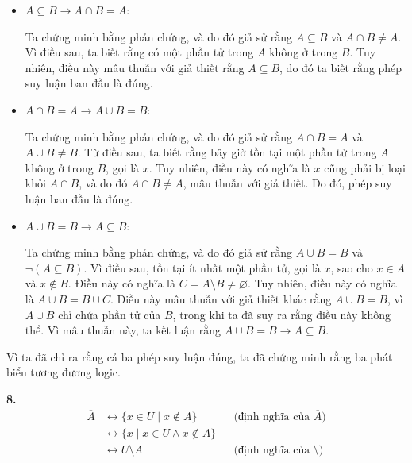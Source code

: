 \documentclass[12pt,a4paper]{article}
\theoremstyle{definition}
\begin{document}
\begin{itemize}
\item $A \subseteq B \to A \cap B = A$:

Ta chứng minh bằng phản chứng, và do đó giả sử rằng $A \subseteq B$ và $A \cap B \neq A$. Vì điều sau, ta biết rằng có một phần tử trong $A$ không ở trong $B$. Tuy nhiên, điều này mâu thuẫn với giả thiết rằng $A \subseteq B$, do đó ta biết rằng phép suy luận ban đầu là đúng.

\item $A \cap B = A \to A \cup B = B$:

Ta chứng minh bằng phản chứng, và do đó giả sử rằng $A \cap B = A$ và $A \cup B \neq B$. Từ điều sau, ta biết rằng bây giờ tồn tại một phần tử trong $A$ không ở trong $B$, gọi là $x$. Tuy nhiên, điều này có nghĩa là $x$ cũng phải bị loại khỏi $A \cap B$, và do đó $A \cap B \neq A$, mâu thuẫn với giả thiết. Do đó, phép suy luận ban đầu là đúng.

\item $A \cup B = B \to A \subseteq B$:

Ta chứng minh bằng phản chứng, và do đó giả sử rằng $A \cup B = B$ và $\neg(A \subseteq B)$. Vì điều sau, tồn tại ít nhất một phần tử, gọi là $x$, sao cho $x \in A$ và $x \notin B$. Điều này có nghĩa là $C = A \setminus B \neq \varnothing$. Tuy nhiên, điều này có nghĩa là $A \cup B = B \cup C$. Điều này mâu thuẫn với giả thiết khác rằng $A \cup B = B$, vì $A \cup B$ chỉ chứa phần tử của $B$, trong khi ta đã suy ra rằng điều này không thể. Vì mâu thuẫn này, ta kết luận rằng $A \cup B = B \to A \subseteq B$.
\end{itemize}

Vì ta đã chỉ ra rằng cả ba phép suy luận đúng, ta đã chứng minh rằng ba phát biểu tương đương logic.

\bigskip
\textbf{8.}
\begin{align*}
\overline{A} &\leftrightarrow \{x \in U \mid x \notin A\} && \text{(định nghĩa của $\overline{A}$)}\\
&\leftrightarrow \{x \mid x \in U \land x \notin A\} \\
&\leftrightarrow U \setminus A && \text{(định nghĩa của $\setminus$)}
\end{align*}
\end{document}
